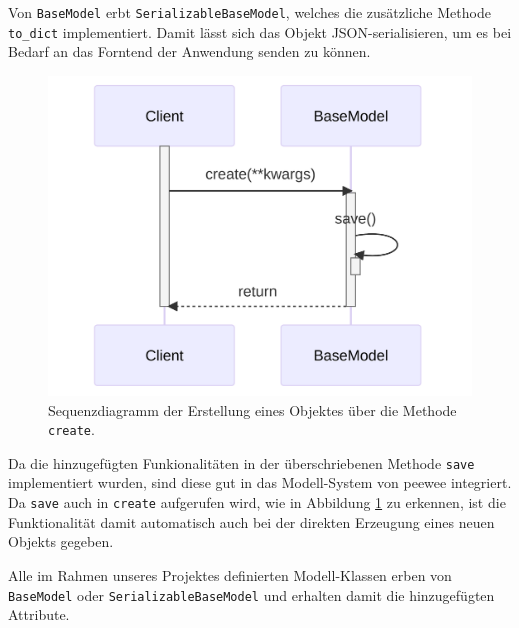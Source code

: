 Von \texttt{BaseModel} erbt \texttt{SerializableBaseModel}, welches die zusätzliche Methode \texttt{to\_dict} implementiert. Damit lässt sich das Objekt JSON-serialisieren, um es bei Bedarf an das Forntend der Anwendung senden zu können.

\begin{figure}[!hb]
	\centering
	\includegraphics[width=0.75\linewidth]{images/diagrams/database-seq.png}
	\caption{Sequenzdiagramm der Erstellung eines Objektes über die Methode \texttt{create}.}
	\label{fig:database-seq}
\end{figure}

Da die hinzugefügten Funkionalitäten in der überschriebenen Methode \texttt{save} implementiert wurden, sind diese gut in das Modell-System von peewee integriert. Da \texttt{save} auch in \texttt{create} aufgerufen wird, wie in Abbildung \ref{fig:database-seq} zu erkennen, ist die Funktionalität damit automatisch auch bei der direkten Erzeugung eines neuen Objekts gegeben.

Alle im Rahmen unseres Projektes definierten Modell-Klassen erben von \texttt{BaseModel} oder \texttt{SerializableBaseModel} und erhalten damit die hinzugefügten Attribute.